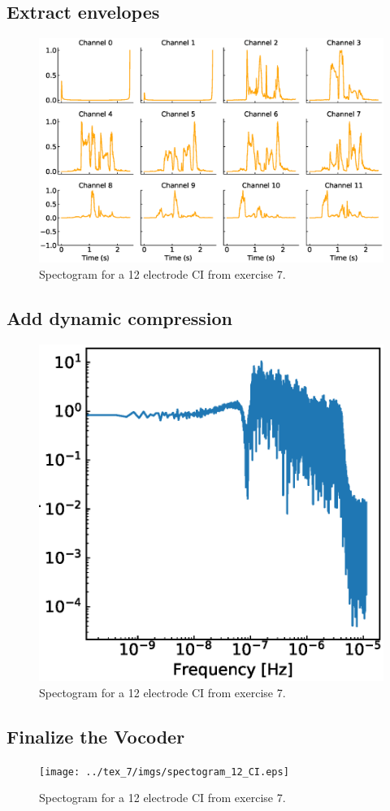 \documentclass{scrartcl}			%
\begin{document}
\subsection{Extract envelopes}
\begin{figure}[H]
\centering
   		 \includegraphics[width=\linewidth]{imgs/envelopes.eps}
   		 \caption{Spectogram for a 12 electrode CI from exercise 7.} 
   		 \label{fig:ci_3} 
\end{figure}

\subsection{Add dynamic compression}
\begin{figure}[H]
\centering
   		 \includegraphics[width=0.8\linewidth]{imgs/vocoder_lower_clip_06.eps}
   		 \caption{Spectogram for a 12 electrode CI from exercise 7.} 
   		 \label{fig:ci_3} 
\end{figure}

\subsection{Finalize the Vocoder}
\begin{figure}[H]
\centering
   		 \texttt{[image: ../tex\_7/imgs/spectogram\_12\_CI.eps]}
   		 \caption{Spectogram for a 12 electrode CI from exercise 7.} 
   		 \label{fig:ci_3} 


\end{figure}
\end{document}
